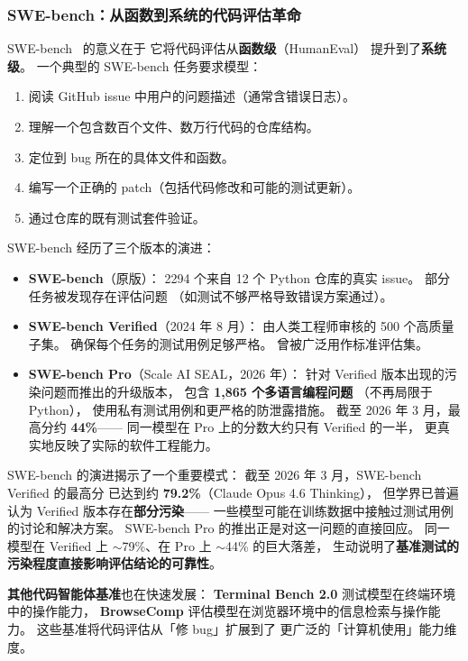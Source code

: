 \subsubsection{SWE-bench：从函数到系统的代码评估革命}

SWE-bench~\cite{jimenez2024swebench} 的意义在于
它将代码评估从\textbf{函数级}（HumanEval）
提升到了\textbf{系统级}。
一个典型的 SWE-bench 任务要求模型：
\begin{enumerate}[noitemsep]
  \item 阅读 GitHub issue 中用户的问题描述（通常含错误日志）。
  \item 理解一个包含数百个文件、数万行代码的仓库结构。
  \item 定位到 bug 所在的具体文件和函数。
  \item 编写一个正确的 patch（包括代码修改和可能的测试更新）。
  \item 通过仓库的既有测试套件验证。
\end{enumerate}

SWE-bench 经历了三个版本的演进：
\begin{itemize}[noitemsep]
  \item \textbf{SWE-bench}（原版）：
        2294 个来自 12 个 Python 仓库的真实 issue。
        部分任务被发现存在评估问题
        （如测试不够严格导致错误方案通过）。
  \item \textbf{SWE-bench Verified}（2024 年 8 月）：
        由人类工程师审核的 500 个高质量子集。
        确保每个任务的测试用例足够严格。
        曾被广泛用作标准评估集。
  \item \textbf{SWE-bench Pro}（Scale AI SEAL，2026 年）：
        针对 Verified 版本出现的污染问题而推出的升级版本，
        包含 \textbf{1,865 个多语言编程问题}
        （不再局限于 Python），
        使用私有测试用例和更严格的防泄露措施。
        截至 2026 年 3 月，最高分约 \textbf{44\%}——
        同一模型在 Pro 上的分数大约只有 Verified 的一半，
        更真实地反映了实际的软件工程能力。
\end{itemize}

SWE-bench 的演进揭示了一个重要模式：
截至 2026 年 3 月，SWE-bench Verified 的最高分
已达到约 \textbf{79.2\%}（Claude Opus 4.6 Thinking），
但学界已普遍认为 Verified 版本存在\textbf{部分污染}——
一些模型可能在训练数据中接触过测试用例的讨论和解决方案。
SWE-bench Pro 的推出正是对这一问题的直接回应。
同一模型在 Verified 上 $\sim$79\%、在 Pro 上 $\sim$44\% 的巨大落差，
生动说明了\textbf{基准测试的污染程度直接影响评估结论的可靠性}。

\textbf{其他代码智能体基准}也在快速发展：
\textbf{Terminal Bench 2.0} 测试模型在终端环境中的操作能力，
\textbf{BrowseComp} 评估模型在浏览器环境中的信息检索与操作能力。
这些基准将代码评估从「修 bug」扩展到了
更广泛的「计算机使用」能力维度。

